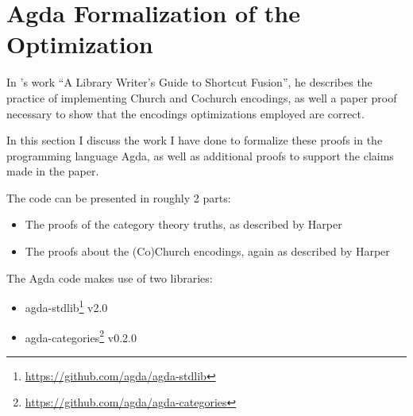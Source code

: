 \section{Agda Formalization of the Optimization}\label{sec:formalization}
In \cite{Harper2011}'s work ``A Library Writer's Guide to Shortcut Fusion'', he describes the practice of implementing Church and Cochurch encodings, as well a paper proof necessary to show that the encodings optimizations employed are correct.

In this section I discuss the work I have done to formalize these proofs in the programming language Agda, as well as additional proofs to support the claims made in the paper.

The code can be presented in roughly 2 parts:
\begin{itemize}
  \item The proofs of the category theory truths, as described by Harper
  \item The proofs about the (Co)Church encodings, again as described by Harper
\end{itemize}

The Agda code makes use of two libraries:
\begin{itemize}[noitemsep]
  \item agda-stdlib\footnote{\url{https://github.com/agda/agda-stdlib}} v2.0
  \item agda-categories\footnote{\url{https://github.com/agda/agda-categories}} v0.2.0
\end{itemize}




